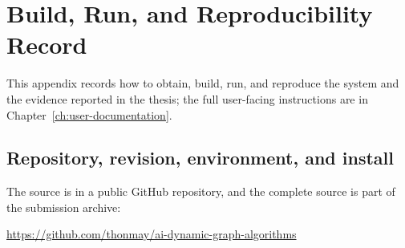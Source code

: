 \chapter{Build, Run, and Reproducibility Record}
\label{app:reproducibility}

This appendix records how to obtain, build, run, and reproduce the system and
the evidence reported in the thesis; the full user-facing instructions are in
Chapter~\ref{ch:user-documentation}.

\section{Repository, revision, environment, and install}

The source is in a public GitHub repository, and the complete source is part
of the submission archive:

\url{https://github.com/thonmay/ai-dynamic-graph-algorithms}

